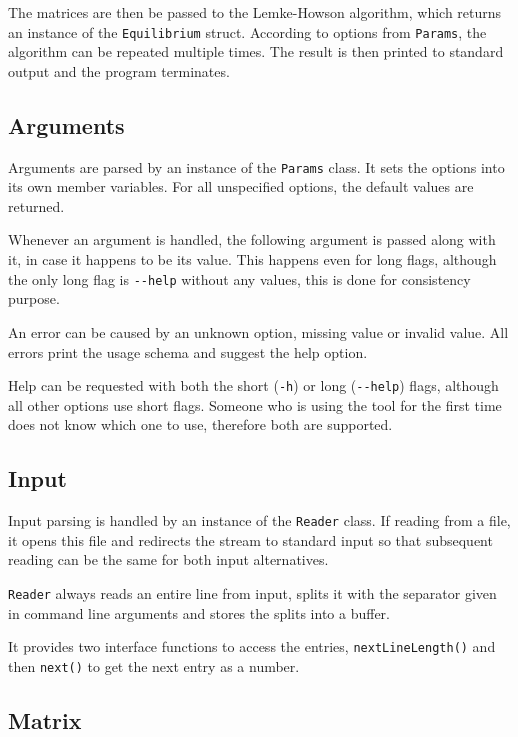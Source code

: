 \documentclass[a4paper,11pt]{article}
\begin{document}
The matrices are then be passed to the Lemke-Howson algorithm, which returns an instance of the \verb|Equilibrium| struct. According to options from \verb|Params|, the algorithm can be repeated multiple times. The result is then printed to standard output and the program terminates.

\subsection{Arguments}

Arguments are parsed by an instance of the \verb|Params| class. It sets the options into its own member variables. For all unspecified options, the default values are returned.

Whenever an argument is handled, the following argument is passed along with it, in case it happens to be its value. This happens even for long flags, although the only long flag is \verb|--help| without any values, this is done for consistency purpose.

An error can be caused by an unknown option, missing value or invalid value. All errors print the usage schema and suggest the help option.

Help can be requested with both the short (\verb|-h|) or long (\verb|--help|) flags, although all other options use short flags. Someone who is using the tool for the first time does not know which one to use, therefore both are supported.

\subsection{Input}

Input parsing is handled by an instance of the \verb|Reader| class. If reading from a file, it opens this file and redirects the stream to standard input so that subsequent reading can be the same for both input alternatives.

\verb|Reader| always reads an entire line from input, splits it with the separator given in command line arguments and stores the splits into a buffer.

It provides two interface functions to access the entries, \verb|nextLineLength()| and then \verb|next()| to get the next entry as a number.

\subsection{Matrix}
\end{document}
